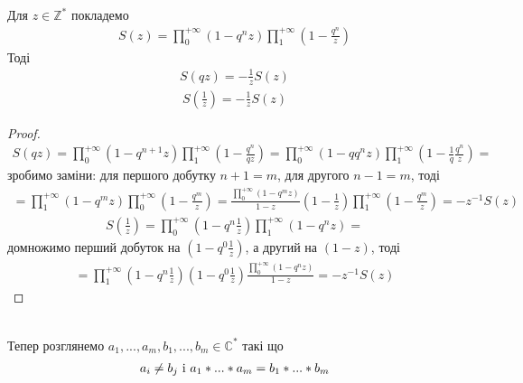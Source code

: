 \documentclass[12pt,a4paper]{article}
\begin{document}
\begin{twerd} Для $z \in \mathbb{Z}^{*}$ покладемо
\[\begin{array}{l} 
 S(z)= \prod\limits_{0}^{+\infty } ( 1-q^{n}z ) \prod\limits_{1}^{+\infty }( 1-\frac{q^{n}}{z})
 \end{array}\]
Тоді
\begin{equation}\label{s1}
\begin{array}{l}
   S(qz)=-\frac{1}{z}S(z)
 \end{array}
\end{equation}  
\begin{equation}\label{s2}
\begin{array}{l}        
   S(\frac{1}{z})= -\frac{1}{z}S(z)
\end{array}
\end{equation}
\end{twerd}
\begin{proof}
\[\begin{array}{l} 
S(qz)= \prod\limits_{0}^{+\infty } ( 1-q^{n+1}z ) \prod\limits_{1}^{+\infty }( 1-\frac{q^{n}}{qz})=
 \prod\limits_{0}^{+\infty } ( 1-qq^{n}z ) \prod\limits_{1}^{+\infty }( 1-\frac{1}{q}\frac{q^{n}}{z})=
 \end{array}\]
зробимо заміни: для першого добутку $n+1=m$, для другого $n-1=m$, тоді 
\[\begin{array}{l} 
 =\prod\limits_{1}^{+\infty } ( 1-q^{m}z ) \prod\limits_{0}^{+\infty }( 1-\frac{q^{m}}{z})=\frac{\prod\limits_{0}^{+\infty } ( 1-q^{m}z )}{1-z}(1-\frac{1}{z})\prod\limits_{1}^{+\infty }( 1-\frac{q^{m}}{z})=-z^{-1}S(z)
\end{array}\]
\[\begin{array}{l} 
 S(\frac{1}{z})= \prod\limits_{0}^{+\infty } ( 1-q^{n}\frac{1}{z} ) \prod\limits_{1}^{+\infty }( 1-q^{n}z)=
\end{array}\]
домножимо перший добуток на $(1-q^{0}\frac{1}{z})$, а другий на $(1-z)$, тоді 
\[\begin{array}{l} 
  =\prod\limits_{1}^{+\infty } ( 1-q^{n}\frac{1}{z} )(1-q^{0}\frac{1}{z})\frac{    \prod\limits_{0}^{+\infty }( 1-q^{n}z)}{1-z}=-z^{-1}S(z)
 \end{array}\]
\end{proof}
\[\begin{array}{l}
\end{array} \]

Тепер розглянемо $a_{1},...,a_{m},b_{1},...,b_{m}\in \mathbb{C}^{*}$ такі що\\
\begin{equation}\label{w1}
\begin{array}{l} 
 a_{i}\neq b_{j}$  i  $a_{1}*...*a_{m}=b_{1}*...*b_{m}
\end{array}
\end{equation} 
\end{document}
